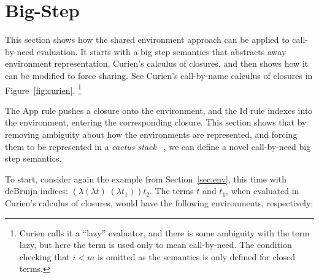 \section{Big-Step \ce} \label{sec:calc}

This section shows how the shared environment approach can be applied to
call-by-need evaluation. It starts with a big step semantics that abstracts away
environment representation, Curien's calculus of closures, and then shows how it
can be modified to force sharing. See Curien's call-by-name calculus of closures
in Figure~\ref{fig:curien}. \footnote{Curien calls it a ``lazy'' evaluator, and
there is some ambiguity with the term lazy, but here the term is used only to
mean call-by-need. The condition checking that $i < m$ is omitted as the
semantics is only defined for closed terms.}

The App rule pushes a closure onto the environment, and the Id rule indexes into
the environment, entering the corresponding closure. This section shows that by
removing ambiguity about how the environments are represented, and forcing them
to be represented in a \emph{cactus stack} ~\cite{stenstrom1988vlsi}, we can
define a novel call-by-need big step semantics.

To start, consider again the example from Section~\ref{sec:env}, this time with
deBruijn indices: $(\lambda(\lambda t) \; (\lambda t_1)) t_2$.  The terms $t$
and $t_1$, when evaluated in Curien's calculus of closures, would have the
following environments, respectively: 

\begin{center}
\end{center}

